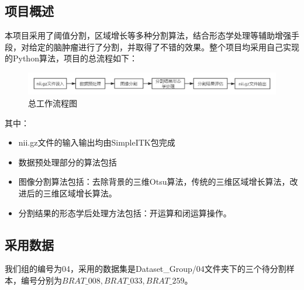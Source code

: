 \documentclass[UTF8]{ctexart}
\begin{document}
\subsection{项目概述}
本项目采用了阈值分割，区域增长等多种分割算法，结合形态学处理等辅助增强手段，对给定的脑肿瘤进行了分割，并取得了不错的效果。整个项目均采用自己实现的Python算法，项目的总流程如下：
\begin{figure}[H]
    \centering  %
    \includegraphics[width=\textwidth]{figure/workflow.png}
    \caption{总工作流程图}
\end{figure}
其中：
\begin{itemize}
    \item nii.gz文件的输入输出均由SimpleITK包完成
    \item 数据预处理部分的算法包括 %
    \item 图像分割算法包括：去除背景的三维Otsu算法，传统的三维区域增长算法，改进后的三维区域增长算法。
    \item 分割结果的形态学后处理方法包括：开运算和闭运算操作。
\end{itemize}

\subsection{采用数据}
我们组的编号为04，采用的数据集是Dataset\_Group/04文件夹下的三个待分割样本，编号分别为$BRAT\_008,BRAT\_033,BRAT\_259$。
\end{document}
